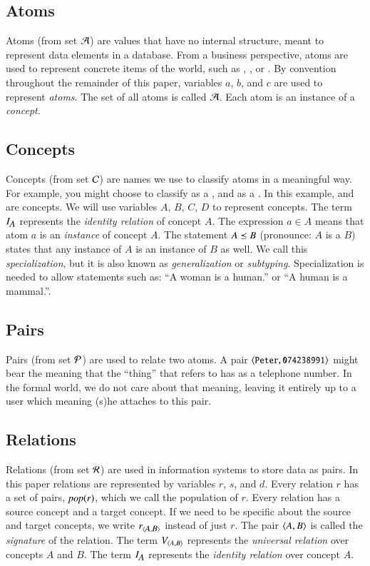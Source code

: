 \documentclass{elsarticle}
\begin{document}
\subsection{Atoms}
	Atoms (from set $\mathcal{A}$) are values that have no internal structure, meant to represent data elements in a database.
	From a business perspective, atoms are used to represent concrete items of the world,
	such as , , or .
	By convention throughout the remainder of this paper, variables $a$, $b$, and $c$ are used to represent \emph{atoms}.
	The set of all atoms is called $\mathcal{A}$.
    Each atom is an instance of a \emph{concept}.
\subsection{Concepts}
	Concepts (from set $\mathcal{C}$) are names we use to classify atoms in a meaningful way.
	For example, you might choose to classify  as a , and  as a .
	In this example,  and  are concepts.
    We will use variables $A$, $B$, $C$, $D$ to represent concepts.
	The term $I_{\text{\it \small A\/}}$ represents the \emph{identity relation} of concept $A$.
	The expression $a \in A$ means that atom $a$ is an \emph{instance} of concept $A$.
	The statement $A\preceq B$ (pronounce: $A$ is a $B$) states that any instance of $A$ is an instance of $B$ as well.
	We call this {\em specialization}, but it is also known as {\em generalization} or {\em subtyping}.
	Specialization is needed to allow statements such as: ``A woman is a human.'' or ``A human is a mammal.''.
\subsection{Pairs}
	Pairs (from set $\mathcal{P}$) are used to relate two atoms.
	A pair $\langle{\text{{\tt\small Peter}}},{\text{{\tt\small 074238991}}}\rangle$ might bear the meaning that the ``thing'' that  refers to
	has  as a telephone number.
	In the formal world, we do not care about that meaning,
	leaving it entirely up to a user which meaning (s)he attaches to this pair.
\subsection{Relations}
	Relations (from set $\mathcal{R}$) are used in information systems to store data as pairs.
	In this paper relations are represented by variables $r$, $s$, and $d$.
	Every relation $r$ has a set of pairs, $\text{\it pop\/}(r)$, which we call the population of $r$.
	Every relation has a source concept and a target concept.
	If we need to be specific about the source and target concepts, we write $\text{\it r\/}_{\langle{\text{\it \small A\/}},{\text{\it \small B\/}}\rangle}$ instead of just $r$.
	The pair $\langle{A},{B}\rangle$ is called the \emph{signature} of the relation.
	The term $V_{\langle{A},{B}\rangle}$ represents the \emph{universal relation} over concepts $A$ and $B$.
	The term $I_{\text{\it \small A\/}}$ represents the \emph{identity relation} over concept $A$.
\end{document}
